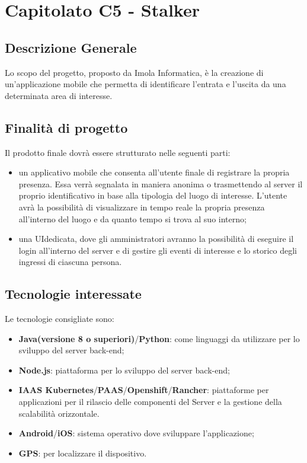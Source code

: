 \section{Capitolato C5 - Stalker}
\subsection{Descrizione Generale}
Lo scopo del progetto, proposto da Imola Informatica, è la creazione di un'applicazione mobile che permetta di identificare l'entrata e l'uscita da una determinata area di interesse.
\subsection{Finalità di progetto}
Il prodotto finale dovrà essere strutturato nelle seguenti parti:
\begin{itemize}
	\item un applicativo mobile che consenta all'utente finale di registrare la propria presenza. Essa verrà segnalata in maniera anonima o trasmettendo al server il proprio identificativo in base alla tipologia del luogo di interesse. L'utente avrà la possibilità di visualizzare in tempo reale la propria presenza all'interno del luogo e da quanto tempo si trova al suo interno;
	\item una UI\glo dedicata, dove gli amministratori avranno la possibilità di eseguire il login all'interno del server e di gestire gli eventi di interesse e lo storico degli ingressi di ciascuna persona.
\end{itemize}
\subsection{Tecnologie interessate}
Le tecnologie consigliate sono:
\begin{itemize}
	\item \textbf{Java\glos(versione 8 o superiori)}/\textbf{Python\glos}: come linguaggi da utilizzare per lo sviluppo del server back-end;
	\item \textbf{Node.js\glos}: piattaforma per lo sviluppo del server back-end;
	\item \textbf{IAAS Kubernetes\glos}/\textbf{PAAS\glos}/\textbf{Openshift\glos}/\textbf{Rancher\glos}: piattaforme per applicazioni per il rilascio delle componenti del Server e la gestione della scalabilità orizzontale.
	\item \textbf{Android\glos}/\textbf{iOS\glos}: sistema operativo dove sviluppare l'applicazione;
	\item \textbf{GPS\glos}: per localizzare il dispositivo.
\end{itemize}
